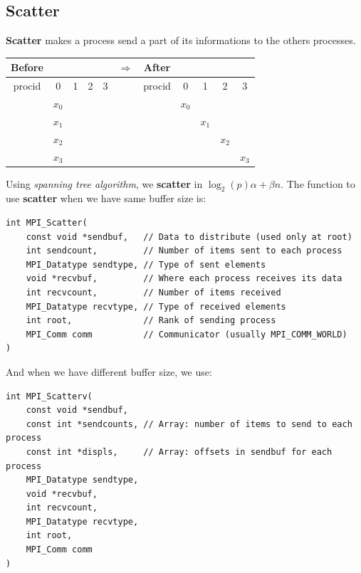 \documentclass[12pt, openany]{report}
\theoremstyle{definition}
\begin{document}
\subsection{Scatter}
\textbf{Scatter} makes a process send a part of its informations to the others processes.\\
\begin{center}
	\begin{tabular}{ccccc|c|ccccc}
		Before &&&&& $\Longrightarrow$ &After&&&&\\
		\hline
		procid & 0 & 1 & 2 & 3 & & procid & 0 & 1 & 2 & 3\\
		\hline
		& $x_0$ &&&&& & $x_0$ &&&\\
		& $x_1$ &&&&& &  & $x_1$ &&\\
		& $x_2$ &&&&& &  && $x_2$ &\\
		& $x_3$ &&&&& &  &&& $x_3$ \\
		\hline
	\end{tabular}
\end{center}
Using \textit{spanning tree algorithm}, we \textbf{scatter} in $\log_2(p)\alpha + \beta n$. The function to use \textbf{scatter} when we have same buffer size is:
\begin{lstlisting}[style=CppStyle]
int MPI_Scatter(
    const void *sendbuf,   // Data to distribute (used only at root)
    int sendcount,         // Number of items sent to each process
    MPI_Datatype sendtype, // Type of sent elements
    void *recvbuf,         // Where each process receives its data
    int recvcount,         // Number of items received
    MPI_Datatype recvtype, // Type of received elements
    int root,              // Rank of sending process
    MPI_Comm comm          // Communicator (usually MPI_COMM_WORLD)
)
\end{lstlisting}
And when we have different buffer size, we use:
\begin{lstlisting}[style=CppStyle]
int MPI_Scatterv(
    const void *sendbuf,
    const int *sendcounts, // Array: number of items to send to each process
    const int *displs,     // Array: offsets in sendbuf for each process
    MPI_Datatype sendtype,
    void *recvbuf,
    int recvcount,
    MPI_Datatype recvtype,
    int root,
    MPI_Comm comm
)
\end{lstlisting}
\end{document}
